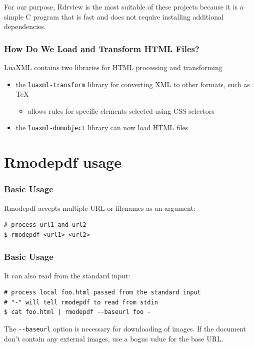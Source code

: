 For our purpose, Rdrview is the most suitable of these projects because it is a
simple C program that is fast and does not require installing additional
dependencies.



\begin{frame}[fragile]
  \frametitle{How Do We Load and Transform HTML Files?}
  LuaXML contains two libraries for HTML processing and transforming
  \begin{itemize}
    \item the \verb|luaxml-transform| library for converting XML to other formats, such as \TeX
      \begin{itemize}
        \item allows rules for specific elements selected using CSS selectors
      \end{itemize}
    \item the \verb|luaxml-domobject| library can now load HTML files
  \end{itemize}
\end{frame}

\section{Rmodepdf usage}

\begin{frame}[fragile]
  \frametitle{Basic Usage}

  \begin{block}{Rmodepdf accepts multiple URL or filenames as an argument:}

    \begin{verbatim}
# process url1 and url2
$ rmodepdf <url1> <url2>
    \end{verbatim}
  \end{block}
\end{frame}


\begin{frame}[fragile]
  \frametitle{Basic Usage}
  \begin{block}{It can also read from the standard input:}
\begin{verbatim}
# process local foo.html passed from the standard input
# "-" will tell rmodepdf to read from stdin
$ cat foo.html | rmodepdf --baseurl foo - 
\end{verbatim}
\end{block}
\end{frame}

The \verb|--baseurl| option is necessary for downloading of images. If the document don't contain any external images, 
use a bogus value for the base URL.

